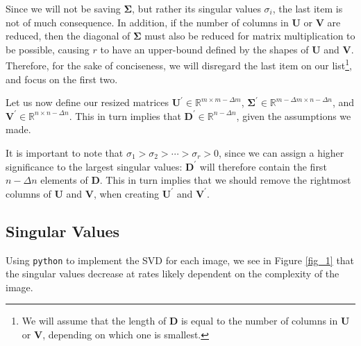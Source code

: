 \documentclass[a4paper,10pt,english]{article}
\begin{document}
\begin{multicols*}{2}
Since we will not be saving $\mathbf{\Sigma}$, but rather its singular values $\sigma_i$, the last item is not of much consequence.  In addition, if the number of columns in $\mathbf{U}$ or $\mathbf{V}$ are reduced, then the diagonal of $\mathbf{\Sigma}$ must also be reduced for matrix multiplication to be possible, causing $r$ to have an upper-bound defined by the shapes of $\mathbf{U}$ and $\mathbf{V}$.  Therefore, for the sake of conciseness, we will disregard the last item on our list\footnote{We will assume that the length of $\mathbf{D}$ is equal to the number of columns in $\mathbf{U}$ or $\mathbf{V}$, depending on which one is smallest.}, and focus on the first two.

Let us now define our resized matrices $\mathbf{U}^\prime \in \mathbb{R}^{m \times m - \Delta m}$, $\mathbf{\Sigma}^\prime \in \mathbb{R}^{m - \Delta m \times n - \Delta n}$, and $\mathbf{V}^\prime \in \mathbb{R}^{n \times n - \Delta n}$.  This in turn implies that $\mathbf{D}^\prime \in \mathbb{R}^{n - \Delta n}$, given the assumptions we made.

It is important to note that $\sigma_1 > \sigma_2 > \cdots > \sigma_r > 0$, since we can assign a higher significance to the largest singular values: $\mathbf{D}^\prime$ will therefore contain the first $n - \Delta n$ elements of $\mathbf{D}$.  This in turn implies that we should remove the rightmost columns of $\mathbf{U}$ and $\mathbf{V}$, when creating $\mathbf{U}^\prime$ and $\mathbf{V}^\prime$.

\subsection*{Singular Values}

Using \texttt{python} to implement the SVD for each image, we see in Figure \ref{fig_1} that the singular values decrease at rates likely dependent on the complexity of the image.


\end{multicols*}
\end{document}
